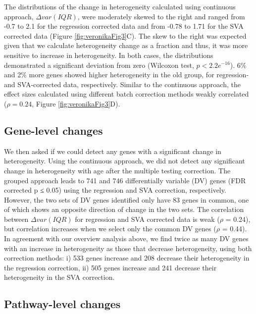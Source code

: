 \documentclass[12pt,twoside]{unicam}
\begin{document}
The distributions of the change in heterogeneity calculated using continuous approach, \(\Delta var(IQR)\), were moderately skewed to the right and ranged from -0.7 to 2.1 for the regression corrected data and from -0.78 to 1.71 for the SVA corrected data (Figure \ref{fig:veronikaFig3}C). The skew to the right was expected given that we calculate heterogeneity change as a fraction and thus, it was more sensitive to increase in heterogeneity. In both cases, the distributions demonstrated a significant deviation from zero (Wilcoxon test, \(p<2.2e^{-16}\)). 6\% and 2\% more genes showed higher heterogeneity in the old group, for regression- and SVA-corrected data, respectively. Similar to the continuous approach, the effect sizes calculated using different batch correction methods weakly correlated (\(\rho = 0.24\), Figure \ref{fig:veronikaFig3}D).

\hypertarget{gene-level-changes}{%
\subsection{Gene-level changes}\label{gene-level-changes}}

We then asked if we could detect any genes with a significant change in heterogeneity. Using the continuous approach, we did not detect any significant change in heterogeneity with age after the multiple testing correction. The grouped approach leads to 741 and 746 differentially variable (DV) genes (FDR corrected p ≤ 0.05) using the regression and SVA correction, respectively. However, the two sets of DV genes identified only have 83 genes in common, one of which shows an opposite direction of change in the two sets. The correlation between \(\Delta var(IQR)\) for regression and SVA corrected data is weak (\(\rho\) = 0.24), but correlation increases when we select only the common DV genes (\(\rho\) = 0.44). In agreement with our overview analysis above, we find twice as many DV genes with an increase in heterogeneity as those that decrease heterogeneity, using both correction methods: i) 533 genes increase and 208 decrease their heterogeneity in the regression correction, ii) 505 genes increase and 241 decrease their heterogeneity in the SVA correction.

\hypertarget{pathway-level-changes}{%
\subsection{Pathway-level changes}\label{pathway-level-changes}}
\end{document}
